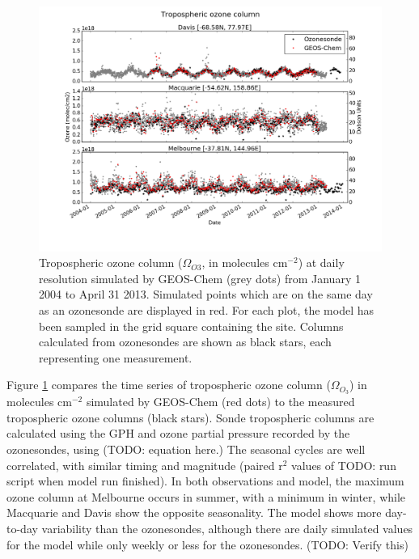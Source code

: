 \documentclass{article}
\begin{document}
  \begin{figure}[!htbp]
    \includegraphics[width=\textwidth]{figures/StationSeries.png}
    \caption{Tropospheric ozone column ($\Omega_{O3}$, in molecules cm$^{-2}$) at daily resolution simulated by GEOS-Chem (grey dots) from January 1 2004 to April 31 2013.
    Simulated points which are on the same day as an ozonesonde are displayed in red.
    For each plot, the model has been sampled in the grid square containing the site.
    Columns calculated from ozonesondes are shown as black stars, each representing one measurement.}
    \label{fig:StationSeriesGEOSChem}
  \end{figure}
  
  Figure \ref{fig:StationSeriesGEOSChem} compares the time series of tropospheric ozone column ($\Omega_{O_3}$) in molecules cm$^{-2}$ simulated by GEOS-Chem (red dots) to the measured tropospheric ozone columns (black stars).
  Sonde tropospheric columns are calculated using the GPH and ozone partial pressure recorded by the ozonesondes, using (TODO: equation here.)
  The seasonal cycles are well correlated, with similar timing and magnitude (paired r$^2$ values of TODO: run script when model run finished). 
  In both observations and model, the maximum ozone column at Melbourne occurs in summer, with a minimum in winter, while Macquarie and Davis show the opposite seasonality.
  The model shows more day-to-day variability than the ozonesondes, although there are daily simulated values for the model while only weekly or less for the ozonesondes. (TODO: Verify this)
  
\end{document}
